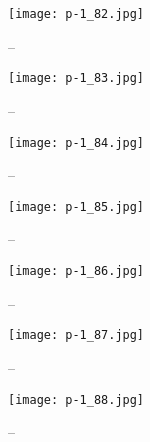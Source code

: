 \clearpage


\begin{figure}
    \begin{center}
        \texttt{[image: p-1\_82.jpg]}
        \caption{--}
    \end{center}
\end{figure}

\clearpage


\begin{figure}
    \begin{center}
        \texttt{[image: p-1\_83.jpg]}
        \caption{--}
    \end{center}
\end{figure}

\clearpage


\begin{figure}
    \begin{center}
        \texttt{[image: p-1\_84.jpg]}
        \caption{--}
    \end{center}
\end{figure}

\clearpage


\begin{figure}
    \begin{center}
        \texttt{[image: p-1\_85.jpg]}
        \caption{--}
    \end{center}
\end{figure}

\clearpage


\begin{figure}
    \begin{center}
        \texttt{[image: p-1\_86.jpg]}
        \caption{--}
    \end{center}
\end{figure}

\clearpage


\begin{figure}
    \begin{center}
        \texttt{[image: p-1\_87.jpg]}
        \caption{--}
    \end{center}
\end{figure}

\clearpage


\begin{figure}
    \begin{center}
        \texttt{[image: p-1\_88.jpg]}
        \caption{--}
    \end{center}
\end{figure}

